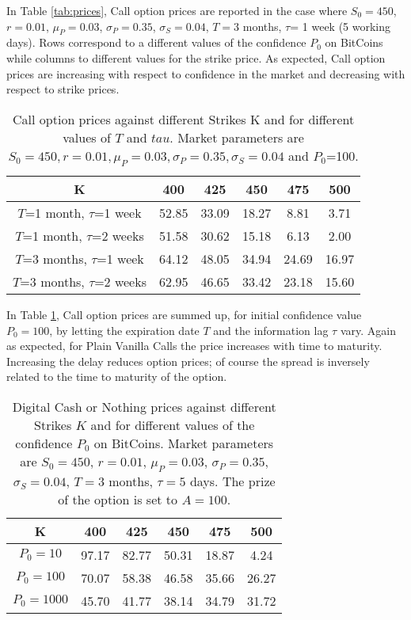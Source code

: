 \documentclass[12pt,centertags,reqno]{amsart}
\numberwithin{equation}{section} \makeatletter
\begin{document}
In Table \ref{tab:prices},  Call option prices are reported  in the case where $S_0=450$, $r=0.01$, $\mu_P=0.03$, $\sigma_P=0.35$, $\sigma_S=0.04$, $T=3$ months, $\tau$= 1 week (5 working days). Rows correspond to a different values of the confidence $P_0$ on BitCoins while columns to different values for the strike price. As expected, Call option prices are increasing with respect to confidence in the market and decreasing with respect to strike prices.
\begin{table} 
 \caption{Call option prices against different Strikes K and for different values of $T$ and $tau$. Market parameters are $S_0=450,r=0.01,\mu_P=0.03,\sigma_P=0.35, \sigma_S=0.04$ and $P_0$=100.}
\label{tab:prices2}
\centering
\begin{tabular}{||c|c|c|c|c|c||}

\hline 
K & 400 & 425 & 450 & 475 & 500 \\ 
\hline
$T$=1 month, $\tau$=1 week & 52.85 & 33.09 & 18.27 & 8.81 & 3.71 \\ 
\hline 
$T$=1 month, $\tau$=2 weeks & 51.58 & 30.62 & 15.18 & 6.13 & 2.00 \\ 
\hline 
$T$=3 months, $\tau$=1 week  & 64.12 & 48.05 & 34.94 & 24.69 & 16.97 \\
\hline
$T$=3 months, $\tau$=2 weeks & 62.95 & 46.65 & 33.42 & 23.18 & 15.60 \\ 
\hline
 \end{tabular}
 \end{table}

In Table \ref{tab:prices2}, Call option prices are summed up, for initial confidence value $P_0=100$, by letting the expiration date $T$ and the information lag $\tau$ vary. Again as expected,  for Plain Vanilla Calls the price increases with time to maturity.
Increasing the delay reduces option prices; of course the spread is inversely related to the time to maturity of the option. 
\begin{table}
\caption{Digital Cash or Nothing prices against different Strikes $K$ and for different values of the confidence $P_0$ on BitCoins. Market parameters are $S_0=450$, $r=0.01$, $\mu_P=0.03$, $\sigma_P=0.35$, $\sigma_S=0.04$, $T=3$ months, $\tau= 5$ days. The prize of the option is set to $A=100$.}
\label{tab:prices3}
\centering
\begin{tabular}{||c|c|c|c|c|c||}
\hline 
K & 400 & 425 & 450 & 475 & 500 \\ 
\hline 
$P_0=10$ & 97.17 & 82.77 & 50.31 & 18.87 & 4.24 \\ 
\hline 
$P_0=100$ & 70.07 & 58.38 &46.58 & 35.66 & 26.27 \\ 
\hline 
$P_0=1000$ & 45.70& 41.77 & 38.14 & 34.79 & 31.72 \\ 
\hline
\end{tabular}
 \end{table}
\end{document}
